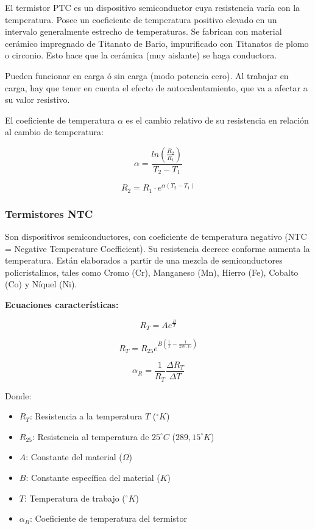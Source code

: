 El termistor PTC es un dispositivo semiconductor cuya resistencia varía con la temperatura. Posee un coeficiente de temperatura positivo elevado en un intervalo generalmente estrecho de temperaturas. Se fabrican con material cerámico impregnado de Titanato de Bario, impurificado con Titanatos de plomo o circonio. Esto hace que la cerámica (muy aislante) se haga conductora.

Pueden funcionar en carga ó sin carga (modo potencia cero). Al trabajar en carga, hay que tener en cuenta el efecto de autocalentamiento, que va a afectar a su valor resistivo.

El coeficiente de temperatura $\alpha$ es el cambio relativo de su resistencia en relación al cambio de temperatura:

\begin{equation}
    \alpha = \frac{ln(\frac{R_2}{R_1})}{T_2 - T_1}
\end{equation}

\begin{equation}
    R_2 = R_1 \cdot e ^ {\alpha (T_2 - T_1)}
\end{equation}

\subsubsection{Termistores NTC}

Son dispositivos semiconductores, con coeficiente de temperatura negativo (NTC = Negative Temperature Coefficient). Su resistencia decrece conforme aumenta la temperatura. Están elaborados a partir de una mezcla de semiconductores policristalinos, tales como Cromo (Cr), Manganeso (Mn), Hierro (Fe), Cobalto (Co) y Níquel (Ni).

\textbf{Ecuaciones características:}

\begin{equation}
    R_T = Ae^{\frac{B}{T}}
\end{equation}

\begin{equation}
    R_T = R_{25} e ^ {B (\frac{1}{T} - \frac{1}{298,15})}
\end{equation}

\begin{equation}
    \alpha_R = \frac{1}{R_T} \frac{\Delta R_T}{\Delta T}
\end{equation}

Donde:
\begin{itemize}
    \item $R_T$: Resistencia a la temperatura $T$ ($^\circ K$)
    \item $R_{25}$: Resistencia  al temperatura de $25^\circ C$ ($289,15 ^\circ K$)
    \item $A$: Constante del material ($\Omega$)
    \item $B$: Constante específica del material ($K$)
    \item $T$: Temperatura de trabajo ($^\circ K$)
    \item $\alpha_R$: Coeficiente de temperatura del termistor
\end{itemize}

